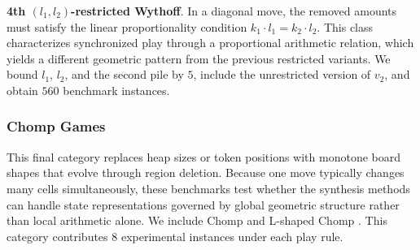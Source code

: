 \documentclass[review]{elsarticle}
\newcommand{\set}[1]{\{ #1 \}}
\newcommand{\tuple}[1]{\langle {#1} \rangle}
\newcommand{\true}{\top}
\newcommand{\statevar}{\mathcal{X}}
\newcommand{\act}{\mathcal{A}}
\newcommand{\constraint}{\mathcal{C}}
\newcommand{\estate}{\mathcal{E}}
\newcommand{\pre}{\mathtt{pre}}
\newcommand{\eff}{\mathtt{eff}}
\begin{document}
{\color{red}\textbf{4th $(l_1,l_2)$-restricted Wythoff}. In a diagonal move, the removed amounts must satisfy the linear proportionality condition $k_1 \cdot l_1 = k_2 \cdot l_2$.}
{\color{red}This class characterizes synchronized play through a proportional arithmetic relation, which yields a different geometric pattern from the previous restricted variants.}
{\color{red}We bound $l_1$, $l_2$, and the second pile by $5$, include the unrestricted version of $v_2$, and obtain $560$ benchmark instances.}

{\color{red}\subsubsection{Chomp Games}}
{\color{red}This final category replaces heap sizes or token positions with monotone board shapes that evolve through region deletion.}
{\color{red}Because one move typically changes many cells simultaneously, these benchmarks test whether the synthesis methods can handle state representations governed by global geometric structure rather than local arithmetic alone.}
{\color{red}We include Chomp \cite{Sch1952} and L-shaped Chomp \cite{Sch1952}.}
{\color{red}This category contributes $8$ experimental instances under each play rule.}
\end{document}

